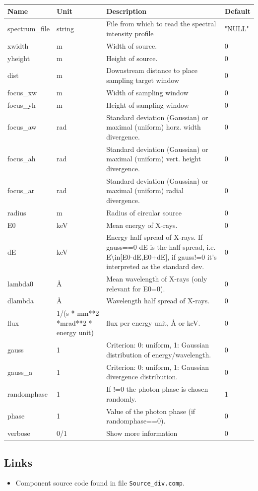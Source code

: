 \begin{longtable}{p{}p{}p{}p{}}
\toprule
\textbf{Name} & \textbf{Unit} & \textbf{Description} & \textbf{Default} \\
\midrule
\endhead
spectrum\_file & string & File from which to read the spectral intensity profile & "NULL" \\
xwidth & m & Width of source. & 0 \\
yheight & m & Height of source. & 0 \\
dist & m & Downstream distance to place sampling target window & 0 \\
focus\_xw & m & Width of sampling window & 0 \\
focus\_yh & m & Height of sampling window & 0 \\
focus\_aw & rad & Standard deviation (Gaussian) or maximal (uniform) horz. width divergence. & 0 \\
focus\_ah & rad & Standard deviation (Gaussian) or maximal (uniform) vert. height divergence. & 0 \\
focus\_ar & rad & Standard deviation (Gaussian) or maximal (uniform) radial divergence. & 0 \\
radius & m & Radius of circular source & 0 \\
E0 & keV & Mean energy of X-rays. & 0 \\
dE & keV & Energy half spread of X-rays. If gauss==0 dE is the half-spread, i.e. E\textbackslash{}in[E0-dE,E0+dE], if gauss!=0 it's interpreted as the standard dev. & 0 \\
lambda0 & \AA{} & Mean wavelength of X-rays (only relevant for E0=0). & 0 \\
dlambda & \AA{} & Wavelength half spread of X-rays. & 0 \\
flux & 1/(s * mm**2 *mrad**2 * energy unit) & flux per energy unit, \AA{} or keV. & 0 \\
gauss & 1 & Criterion: 0: uniform, 1: Gaussian distribution of energy/wavelength. & 0 \\
gauss\_a & 1 & Criterion: 0: uniform, 1: Gaussian divergence distribution. & 0 \\
randomphase & 1 & If !=0 the photon phase is chosen randomly. & 1 \\
phase & 1 & Value of the photon phase (if randomphase==0). & 0 \\
verbose & 0/1 & Show more information & 0 \\
\bottomrule
\end{longtable}

\subsection*{Links}
\begin{itemize}
  \item Component source code found in file \texttt{Source\_div.comp}.
\end{itemize}
